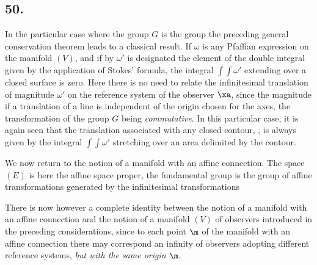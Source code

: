 \subsection*{50.}

In the particular case where the group $G$ is the group
the preceding general conservation theorem leads to a classical result. If $\omega$ is any Pfaffian expression on the manifold $(V)$, and if by $\omega'$ is designated the element of the double integral given by the application of Stokes' formula, the integral $\int\int\omega'$ extending over a closed surface is zero. Here there is no need to relate the infinitesimal translation of magnitude $\omega'$ on the reference system of the observer $\xa$, since the magnitude if a translation of a line is independent of the origin chosen for the axes, the transformation of the group $G$ being \textit{commutative}. In this particular case, it is again seen that the translation associated with any closed contour, , is always given by the integral $\int\int\omega'$ stretching over an area delimited by the contour.

We now return to the notion of a manifold with an affine connection. The space $(E)$ is here the affine space proper, the fundamental group is the group of affine transformations generated by the infinitesimal transformations

There is now however a complete identity between the notion of a manifold with an affine connection and the notion of a manifold $(V)$ of observers introduced in the preceding considerations, since to each point $\m$ of the manifold with an affine connection there may correspond an infinity of observers adopting different reference systems, \textit{but with the same origin $\m$}.